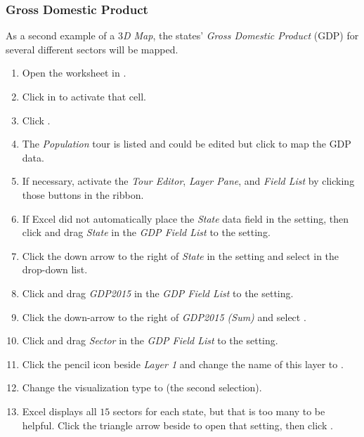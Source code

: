 \subsubsection{Gross Domestic Product}

As a second example of a \textit{$ 3 $D Map}, the states' \textit{Gross Domestic Product} (GDP) for several different sectors will be mapped.

\begin{enumbox}
	\begin{enumerate}
		\item Open the  worksheet in .
		\item Click in  to activate that cell.
		\item Click .
		\item The \textit{Population} tour is listed and could be edited but click  to map the GDP data.
		\item If necessary, activate the \textit{Tour Editor}, \textit{Layer Pane}, and \textit{Field List} by clicking those buttons in the ribbon.
		\item If Excel did not automatically place the \textit{State} data field in the  setting, then click and drag \textit{State} in the \textit{GDP Field List} to the  setting. 
		\item Click the down arrow to the right of \textit{State} in the  setting and select  in the drop-down list.
		\item Click and drag \textit{GDP2015} in the \textit{GDP Field List} to the  setting.
		\item Click the down-arrow to the right of \textit{GDP2015 (Sum)} and select .
		\item Click and drag \textit{Sector} in the \textit{GDP Field List} to the  setting.
		\item Click the pencil icon beside \textit{Layer 1} and change the name of this layer to .
		\item Change the visualization type to  (the second selection).
		\item Excel displays all $ 15 $ sectors for each state, but that is too many to be helpful. Click the triangle arrow beside  to open that setting, then click .

\end{enumerate}
\end{enumbox}
